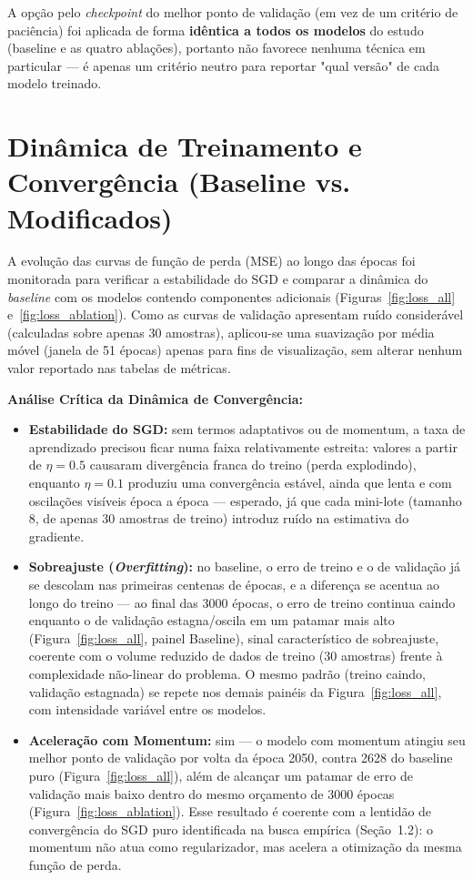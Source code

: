 \documentclass[11pt,a4paper]{article}
\begin{document}
A opção pelo \textit{checkpoint} do melhor ponto de validação (em vez de um critério de paciência) foi aplicada de forma \textbf{idêntica a todos os modelos} do estudo (baseline e as quatro ablações), portanto não favorece nenhuma técnica em particular — é apenas um critério neutro para reportar "qual versão" de cada modelo treinado.

\section{Dinâmica de Treinamento e Convergência (Baseline vs. Modificados)}

A evolução das curvas de função de perda (MSE) ao longo das épocas foi monitorada para verificar a estabilidade do SGD e comparar a dinâmica do \textit{baseline} com os modelos contendo componentes adicionais (Figuras~\ref{fig:loss_all} e~\ref{fig:loss_ablation}). Como as curvas de validação apresentam ruído considerável (calculadas sobre apenas 30 amostras), aplicou-se uma suavização por média móvel (janela de 51 épocas) apenas para fins de visualização, sem alterar nenhum valor reportado nas tabelas de métricas.

\textbf{Análise Crítica da Dinâmica de Convergência:}
\begin{itemize}
    \item \textbf{Estabilidade do SGD:} sem termos adaptativos ou de momentum, a taxa de aprendizado precisou ficar numa faixa relativamente estreita: valores a partir de $\eta = 0.5$ causaram divergência franca do treino (perda explodindo), enquanto $\eta = 0.1$ produziu uma convergência estável, ainda que lenta e com oscilações visíveis época a época — esperado, já que cada mini-lote (tamanho 8, de apenas 30 amostras de treino) introduz ruído na estimativa do gradiente.
    \item \textbf{Sobreajuste (\textit{Overfitting}):} no baseline, o erro de treino e o de validação já se descolam nas primeiras centenas de épocas, e a diferença se acentua ao longo do treino — ao final das 3000 épocas, o erro de treino continua caindo enquanto o de validação estagna/oscila em um patamar mais alto (Figura~\ref{fig:loss_all}, painel Baseline), sinal característico de sobreajuste, coerente com o volume reduzido de dados de treino (30 amostras) frente à complexidade não-linear do problema. O mesmo padrão (treino caindo, validação estagnada) se repete nos demais painéis da Figura~\ref{fig:loss_all}, com intensidade variável entre os modelos.
    \item \textbf{Aceleração com Momentum:} sim — o modelo com momentum atingiu seu melhor ponto de validação por volta da época 2050, contra 2628 do baseline puro (Figura~\ref{fig:loss_all}), além de alcançar um patamar de erro de validação mais baixo dentro do mesmo orçamento de 3000 épocas (Figura~\ref{fig:loss_ablation}). Esse resultado é coerente com a lentidão de convergência do SGD puro identificada na busca empírica (Seção~1.2): o momentum não atua como regularizador, mas acelera a otimização da mesma função de perda.
\end{itemize}
\end{document}
